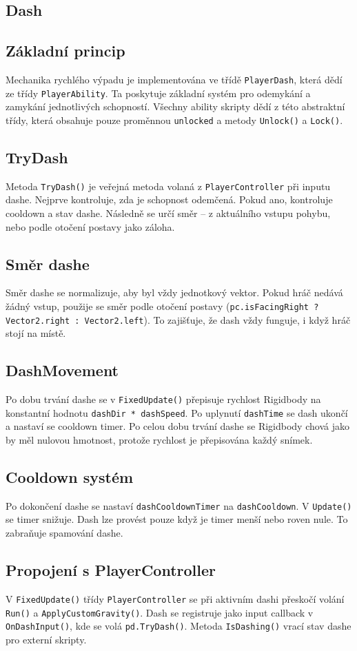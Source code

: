 \subsection{Dash}

\subsection{Základní princip}
Mechanika rychlého výpadu je implementována ve třídě \texttt{PlayerDash}, která dědí ze třídy \texttt{PlayerAbility}. Ta poskytuje základní systém pro odemykání a zamykání jednotlivých schopností. Všechny ability skripty dědí z této abstraktní třídy, která obsahuje pouze proměnnou \texttt{unlocked} a metody \texttt{Unlock()} a \texttt{Lock()}.

\subsection{TryDash}
Metoda \texttt{TryDash()} je veřejná metoda volaná z \texttt{PlayerController} při inputu dashe. Nejprve kontroluje, zda je schopnost odemčená. Pokud ano, kontroluje cooldown a stav dashe. Následně se určí směr -- z aktuálního vstupu pohybu, nebo podle otočení postavy jako záloha.

\subsection{Směr dashe}
Směr dashe se normalizuje, aby byl vždy jednotkový vektor. Pokud hráč nedává žádný vstup, použije se směr podle otočení postavy (\texttt{pc.isFacingRight ? Vector2.right : Vector2.left}). To zajišťuje, že dash vždy funguje, i když hráč stojí na místě.

\subsection{DashMovement}
Po dobu trvání dashe se v \texttt{FixedUpdate()} přepisuje rychlost Rigidbody na konstantní hodnotu \texttt{dashDir * dashSpeed}. Po uplynutí \texttt{dashTime} se dash ukončí a nastaví se cooldown timer. Po celou dobu trvání dashe se Rigidbody chová jako by měl nulovou hmotnost, protože rychlost je přepisována každý snímek.

\subsection{Cooldown systém}
Po dokončení dashe se nastaví \texttt{dashCooldownTimer} na \texttt{dashCooldown}. V \texttt{Update()} se timer snižuje. Dash lze provést pouze když je timer menší nebo roven nule. To zabraňuje spamování dashe.

\subsection{Propojení s PlayerController}
V \texttt{FixedUpdate()} třídy \texttt{PlayerController} se při aktivním dashi přeskočí volání \texttt{Run()} a \texttt{ApplyCustomGravity()}. Dash se registruje jako input callback v \texttt{OnDashInput()}, kde se volá \texttt{pd.TryDash()}. Metoda \texttt{IsDashing()} vrací stav dashe pro externí skripty.

